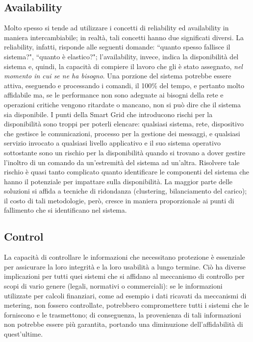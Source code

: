 \subsection{Availability}
Molto spesso si tende ad utilizzare i concetti di reliability ed availability in maniera intercambiabile; in realtà, tali concetti hanno due significati diversi. La reliability, infatti, risponde alle seguenti domande: ``quanto spesso fallisce il sistema?", ``quanto è elastico?"; l'availability, invece, indica la disponibilità del sistema e, quindi, la capacità di compiere il lavoro che gli è stato assegnato, \textit{nel momento in cui se ne ha bisogno}. \newline Una porzione del sistema potrebbe essere attiva, eseguendo e processando i comandi, il 100\% del tempo, e pertanto molto affidabile ma, se le performance non sono adeguate ai bisogni della rete e operazioni critiche vengono ritardate o mancano, non si può dire che il sistema sia disponibile. \newline
I punti della Smart Grid che introducono rischi per la disponibilità sono troppi per poterli elencare: qualsiasi sistema, rete, dispositivo che gestisce le comunicazioni, processo per la gestione dei messaggi, e qualsiasi servizio invocato a qualsiasi livello applicativo e il suo sistema operativo sottostante sono un rischio per la disponibilità quando si trovano a dover gestire l'inoltro di un comando da un'estremità del sistema ad un'altra. Risolvere tale rischio è quasi tanto complicato quanto identificare le componenti del sistema che hanno il potenziale per impattare sulla disponibilità. La maggior parte delle soluzioni si affida a tecniche di ridondanza (clustering, bilanciamento del carico); il costo di tali metodologie, però, cresce in maniera proporzionale ai punti di fallimento che si identificano nel sistema. 

\subsection{Control}
La capacità di controllare le informazioni che necessitano protezione è essenziale per assicurare la loro integrità e la loro usabilità a lungo termine. Ciò ha diverse implicazioni per tutti quei sistemi che si affidano al meccanismo di controllo per scopi di vario genere (legali, normativi o commerciali): se le informazioni utilizzate per calcoli finanziari, come ad esempio i dati ricavati da meccanismi di metering, non fossero controllate, potrebbero compromettere tutti i sistemi che le forniscono e le trasmettono; di conseguenza, la provenienza di tali informazioni non potrebbe essere più garantita, portando una diminuzione dell'affidabilità di quest'ultime. 

